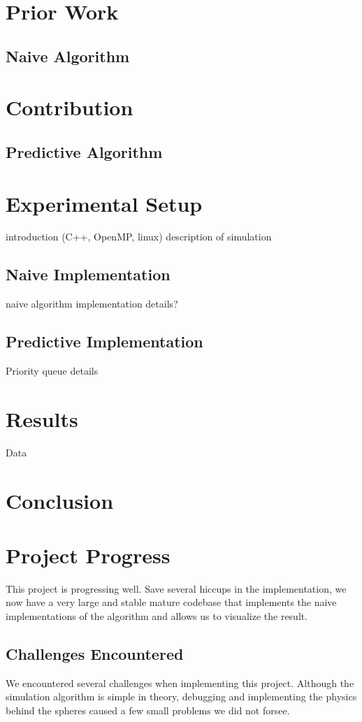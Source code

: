 \documentclass[conference]{IEEEtran}
\begin{document}
\section{Prior Work}
\subsection{Naive Algorithm}

\section{Contribution}
\subsection{Predictive Algorithm}

\section{Experimental Setup}%
introduction (C++, OpenMP, linux)
description of simulation
\subsection{Naive Implementation}
naive algorithm implementation details?
\subsection{Predictive Implementation}
Priority queue details
\section{Results} %
Data
\section{Conclusion} 

\appendix %
\section{Project Progress}
This project is progressing well.  Save several hiccups in the implementation, we now have a very large and stable mature codebase that implements the naive implementations of the algorithm and allows
us to visualize the result.
\subsection{Challenges Encountered}
We encountered several challenges when implementing this project.  Although the simulation algorithm is simple in theory, debugging and implementing the physics behind the spheres caused a few small problems we did not forsee.
\end{document}
